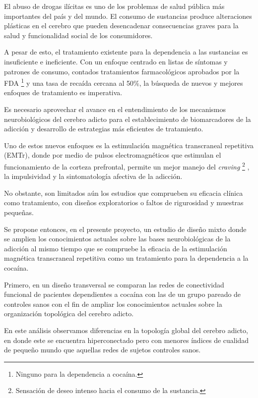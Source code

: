 El abuso de drogas ilícitas es uno de los problemas de salud pública más
importantes del país y del mundo.
El consumo de sustancias produce alteraciones plásticas en el
cerebro que pueden desencadenar consecuencias graves para la salud y funcionalidad
social de los consumidores. \par
A pesar de esto, el tratamiento existente para la dependencia a las sustancias es insuficiente e ineficiente.
Con un enfoque centrado en listas de síntomas y patrones de consumo, contados tratamientos farmacológicos aprobados por la FDA
\footnote{Ninguno para la dependencia a cocaína.}
y una tasa de recaída cercana al 50\%, la búsqueda de nuevos y mejores enfoques de tratamiento es imperativa.\par
Es necesario aprovechar el avance en el entendimiento de los mecanismos neurobiológicos del cerebro adicto para el establecimiento de biomarcadores de la adicción y desarrollo de estrategias más eficientes de tratamiento.\par
Uno de estos nuevos enfoques es la estimulación magnética transcraneal repetitiva (EMTr), donde por medio de pulsos electromagnéticos que estimulan el funcionamiento de la corteza prefrontal, permite un mejor manejo del \textit{craving}
\footnote{Sensación de deseo intenso hacia el consumo de la sustancia.}
, la impulsividad y la sintomatología afectiva de la adicción. \par
No obstante, son limitados aún los estudios que comprueben su eficacia clínica como tratamiento, con diseños exploratorios o faltos de rigurosidad y muestras pequeñas. \par
Se propone entonces, en el presente proyecto, un estudio de diseño mixto donde se amplien los conocimientos actuales sobre las bases neurobiológicas de la adicción al mismo tiempo que se compruebe la eficacia de la estimulación magnética transcraneal repetitiva como un tratamiento para la dependencia a la cocaína.\par
Primero, en un diseño transversal se comparan las redes de conectividad funcional de pacientes dependientes a cocaína con las de un grupo pareado de controles sanos con el fin de ampliar los conocimientos actuales sobre la organización topológica del cerebro adicto.\par
En este análisis observamos diferencias en la topología global del cerebro adicto, en donde este se encuentra hiperconectado pero con menores índices de cualidad de pequeño mundo que aquellas redes de sujetos controles sanos.
